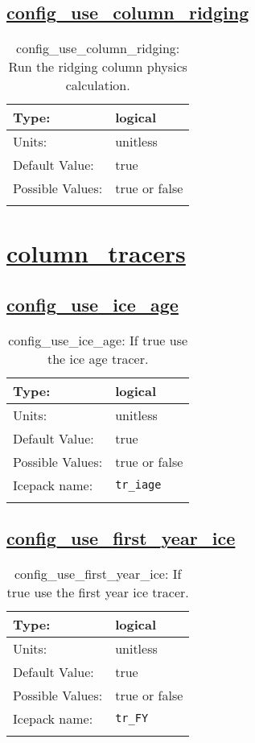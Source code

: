 \subsection[config\_use\_column\_ridging]{\hyperref[sec:nm_tab_column_package]{config\_use\_column\_ridging}}
\label{subsec:nm_sec_config_use_column_ridging}
\begin{center}
\begin{longtable}{| p{2.0in} || p{4.0in} |}
    \hline
    Type: & logical \\
    \hline
    Units: & \si{unitless} \\
    \hline
    Default Value: & true \\
    \hline
    Possible Values: & true or false \\
    \hline
    \caption{config\_use\_column\_ridging: Run the ridging column physics calculation.}
\end{longtable}
\end{center}
\section[column\_tracers]{\hyperref[sec:nm_tab_column_tracers]{column\_tracers}}
\label{sec:nm_sec_column_tracers}
\subsection[config\_use\_ice\_age]{\hyperref[sec:nm_tab_column_tracers]{config\_use\_ice\_age}}
\label{subsec:nm_sec_config_use_ice_age}
\begin{center}
\begin{longtable}{| p{2.0in} || p{4.0in} |}
    \hline
    Type: & logical \\
    \hline
    Units: & \si{unitless} \\
    \hline
    Default Value: & true \\
    \hline
    Possible Values: & true or false \\
    \hline
    \hline
    Icepack name: & \verb+tr_iage+ \\
    \caption{config\_use\_ice\_age: If true use the ice age tracer.}
\end{longtable}
\end{center}
\subsection[config\_use\_first\_year\_ice]{\hyperref[sec:nm_tab_column_tracers]{config\_use\_first\_year\_ice}}
\label{subsec:nm_sec_config_use_first_year_ice}
\begin{center}
\begin{longtable}{| p{2.0in} || p{4.0in} |}
    \hline
    Type: & logical \\
    \hline
    Units: & \si{unitless} \\
    \hline
    Default Value: & true \\
    \hline
    Possible Values: & true or false \\
    \hline
    \hline
    Icepack name: & \verb+tr_FY+ \\
    \caption{config\_use\_first\_year\_ice: If true use the first year ice tracer.}
\end{longtable}
\end{center}
